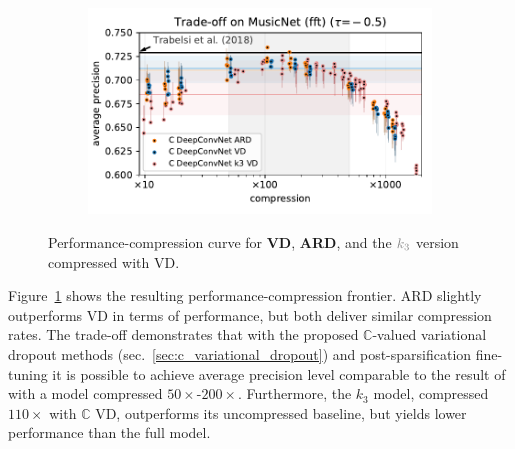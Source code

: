 \documentclass[a4paper,10pt,twocolumn]{article}
\newcommand{\cplx}{\mathbb{C}}
\begin{document}
\begin{figure}[!t]
  \centering
  \begin{subfigure}[b]{1.\columnwidth}  %
    \centering
    \includegraphics[width=\columnwidth]{figure__musicnet__trade-off/paper__musicnetram__fft__-0.5.pdf}
  \end{subfigure}
  \caption{%
    Performance-compression curve for \textbf{\color{blue} VD}, \textbf{\color{orange} ARD},
    and the ${\color{gray} k_3}$ version compressed with VD.
  }
  \label{fig:musicnet__trade-off}
\end{figure}

Figure~\ref{fig:musicnet__trade-off} shows the resulting performance-compression frontier.
ARD slightly outperforms VD in terms of performance, but both deliver similar compression
rates. The trade-off demonstrates that with the proposed $\cplx$-valued variational dropout
methods (sec.~\ref{sec:c_variational_dropout}) and post-sparsification fine-tuning it is
possible to achieve average precision level comparable to the result of \citet{trabelsi_deep_2018}
with a model compressed $50\times$-$200\times$. Furthermore, the $k_3$ model, compressed
$110 \times$ with $\cplx$ VD, outperforms its uncompressed baseline, but yields lower
performance than the full model.
\end{document}
